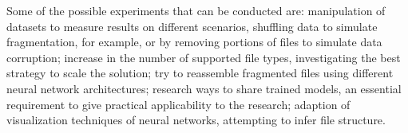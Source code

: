 Some of the possible experiments that can be conducted are: 
%
manipulation of datasets to measure results on different scenarios,  shuffling data to simulate fragmentation, for example, or by removing portions of files to simulate data corruption;
%
increase in the number of supported file types, investigating the best strategy to scale the solution;
%
try to reassemble fragmented files using different neural network architectures;
%
research ways to share trained models, an essential requirement to give practical applicability to the research;
%
adaption of visualization techniques of neural networks, attempting to infer file structure.
